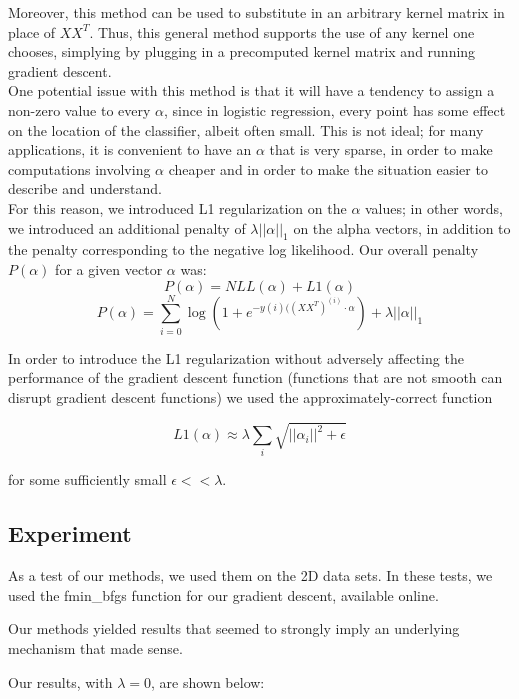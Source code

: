 \documentclass{sigchi}
\begin{document}
{Moreover, this method can be used to substitute in an arbitrary kernel matrix in place of $XX^T$. Thus, this general method supports the use of any kernel one chooses, simplying by plugging in a precomputed kernel matrix and running gradient descent. \\

One potential issue with this method is that it will have a tendency to assign a non-zero value to every $\alpha$, since in logistic regression, every point has some effect on the location of the classifier, albeit often small. This is not ideal; for many applications, it is convenient to have an $\alpha$ that is very sparse, in order to make computations involving $\alpha$ cheaper and in order to make the situation easier to describe and understand. \\

For this reason, we introduced L1 regularization on the $\alpha$ values; in other words, we introduced an additional penalty of $\lambda ||\alpha||_1$ on the alpha vectors, in addition to the penalty corresponding to the negative log likelihood. Our overall penalty $P(\alpha)$ for a given vector $\alpha$ was: \\

$$P(\alpha) = NLL(\alpha) + L1(\alpha)$$
$$P(\alpha) = \sum_{i=0}^N \log(1+e^{-y{(i)}((XX^T)^{(i)} \cdot \alpha}) + \lambda||\alpha||_1$$

In order to introduce the L1 regularization without adversely affecting the performance of the gradient descent function (functions that are not smooth can disrupt gradient descent functions) we used the approximately-correct function 

$$L1(\alpha) \approx \lambda \sum_i \sqrt{||\alpha_i||^2 + \epsilon}$$

for some sufficiently small $\epsilon << \lambda$. 

\subsection{Experiment}

As a test of our methods, we used them on the 2D data sets. In these tests, we used the fmin_bfgs function for our gradient descent, available online.

 Our methods yielded results that seemed to strongly imply an underlying mechanism that made sense.  

Our results, with $\lambda = 0$, are shown below:

\begin{figure}
\centering


\end{figure}}
\end{document}
